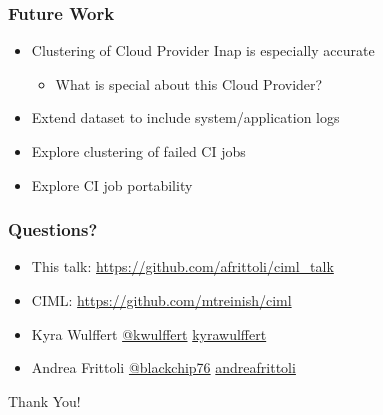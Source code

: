 \documentclass[aspectratio=169,11pt,hyperref={colorlinks=true}]{beamer}
\begin{document}
\begin{frame}
  \frametitle{Future Work}
  \begin{itemize}
    \item{Clustering of Cloud Provider Inap is especially accurate}
    \begin{itemize}
      \item[] What is special about this Cloud Provider?
    \end{itemize}
    \item{Extend dataset to include system/application logs}
    \item{Explore clustering of failed CI jobs}
    \item{Explore CI job portability}
  \end{itemize}
\end{frame}

\begin{frame}
  \frametitle{Questions?}
  \begin{itemize}
    \item{This talk: \href{https://github.com/afrittoli/ciml\_talk}{https://github.com/afrittoli/ciml\_talk}}
    \item{CIML: \href{https://github.com/mtreinish/ciml}{https://github.com/mtreinish/ciml}}
  \end{itemize}
  \begin{itemize}
    \item Kyra Wulffert  \href{https://twitter.com/kwulffert/}{@kwulffert}  \href{https://www.linkedin.com/in/kyrawulffert/}{kyrawulffert}
    \item Andrea Frittoli  \href{https://twitter.com/blackchip76}{@blackchip76}  \href{https://www.linkedin.com/in/andreafrittoli/}{andreafrittoli}
  \end{itemize}

\end{frame}

\begin{centraldark}{Thank You!}\end{centraldark}
\end{document}
